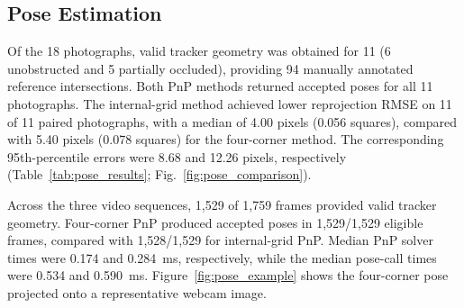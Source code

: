 \subsection{Pose Estimation}
Of the 18 photographs, valid tracker geometry was obtained for 11
(6 unobstructed and 5 partially occluded), providing 94 manually annotated
reference intersections. Both PnP methods returned accepted poses for all
11 photographs. The internal-grid method achieved lower reprojection RMSE
on 11 of 11 paired photographs, with a median of 4.00 pixels
(0.056 squares), compared with 5.40 pixels (0.078 squares)
for the four-corner method. The corresponding 95th-percentile errors were
8.68 and 12.26 pixels, respectively (Table~\ref{tab:pose_results};
Fig.~\ref{fig:pose_comparison}).

Across the three video sequences, 1,529 of 1,759 frames provided valid
tracker geometry. Four-corner PnP produced accepted poses in
1,529/1,529 eligible frames, compared with 1,528/1,529
for internal-grid PnP. Median PnP solver times were 0.174 and
0.284~ms, respectively, while the median pose-call times were
0.534 and 0.590~ms.
Figure~\ref{fig:pose_example} shows the four-corner pose projected onto a representative webcam image.
